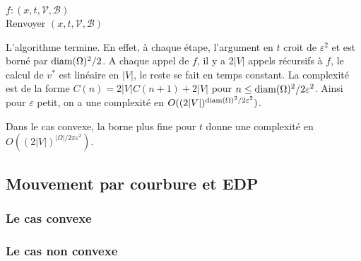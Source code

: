 \documentclass{article}
\begin{document}
\begin{algorithm}[H]
	$f : (x, t, \mathcal{V}, \mathcal{B})$\\
	\textup{Renvoyer } $(x,t,\mathcal{V},\mathcal{B})$
\end{algorithm}

L'algorithme termine. En effet, à chaque étape, l'argument en $t$ croit de $\varepsilon^2$ et est borné par $\textup{diam}(\Omega)^2/2$. A chaque appel de $f$, il y a $2|V|$ appels récursifs à $f$, le calcul de $v^*$ est linéaire en $|V|$, le reste se fait en temps constant. La complexité est de la forme $C(n) = 2|V|C(n+1) + 2|V|$ pour $n\leq \textup{diam}(\Omega)^2/2\varepsilon^2$. Ainsi pour $\varepsilon$ petit, on a une complexité en $O((2|V|)^{\textup{diam}(\Omega)^2/2\varepsilon^2})$.

Dans le cas convexe, la borne plus fine pour $t$ donne une complexité en $O((2|V|)^{|\Omega|/2\pi\varepsilon^2})$.

\subsection{Mouvement par courbure et EDP}
\subsubsection{Le cas convexe}
\subsubsection{Le cas non convexe}
\end{document}
